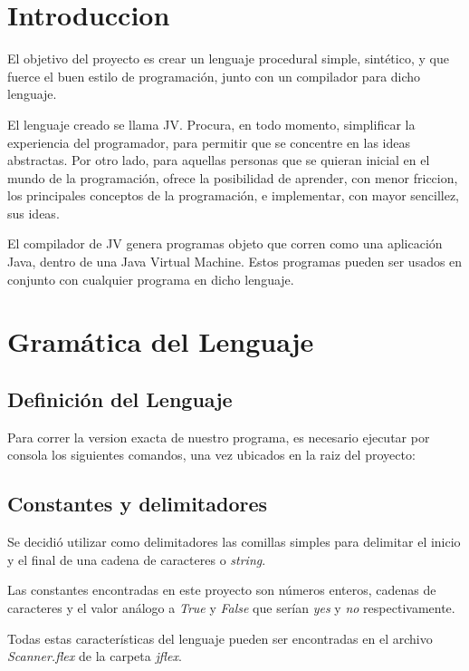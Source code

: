 \documentclass{article}
\begin{document}

\clearpage
\tableofcontents

\clearpage

\section{Introduccion}
\par El objetivo del proyecto es crear un lenguaje procedural simple, sintético, y que fuerce el buen estilo de programación, junto con un compilador para dicho lenguaje.\\
\par El lenguaje creado se llama JV. Procura, en todo momento, simplificar la experiencia del programador, para permitir que se concentre en las ideas abstractas. Por otro lado, para aquellas personas que se quieran inicial en el mundo de la programación, ofrece la posibilidad de aprender, con menor friccion, los principales conceptos de la programación, e implementar, con mayor sencillez, sus ideas.\\
\par El compilador de JV genera  programas objeto que corren como una aplicación Java, dentro de una Java Virtual Machine. Estos programas pueden ser usados en conjunto con cualquier programa en dicho lenguaje.\\
\clearpage


\section{Gramática del Lenguaje}

\subsection{Definición del Lenguaje}
\par Para correr la version exacta de nuestro programa, es necesario ejecutar por consola los siguientes comandos, una vez ubicados en la raiz del proyecto:
\subsection{Constantes y delimitadores}
\par Se decidió utilizar como delimitadores las comillas simples para delimitar el inicio y el final de una cadena de caracteres o \textit{string}.
\par Las constantes encontradas en este proyecto son números enteros, cadenas de caracteres y el valor análogo a \textit{True} y \textit{False} que serían \textit{yes} y \textit{no} respectivamente.
\par Todas estas características del lenguaje pueden ser encontradas en el archivo \textit{Scanner.flex} de la carpeta \textit{jflex}. 
\end{document}
